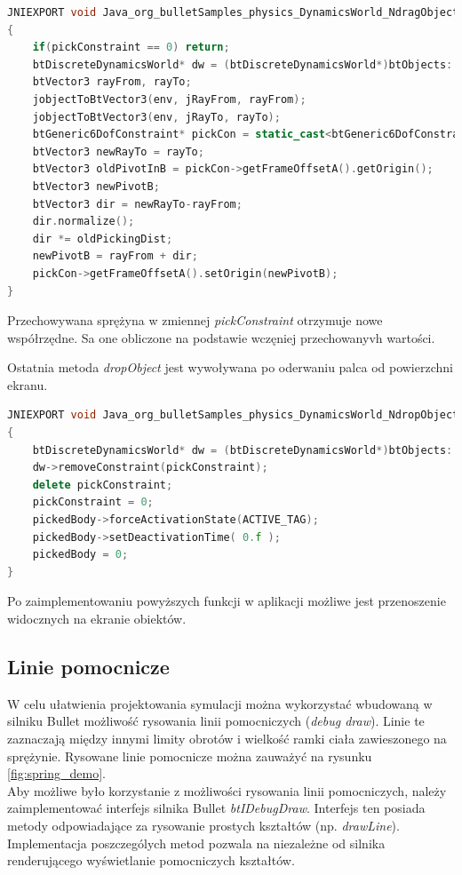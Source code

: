 \begin{lstlisting}[language=c++, caption=Implementacja
metody dragObject,label=lis:dragObject]
JNIEXPORT void Java_org_bulletSamples_physics_DynamicsWorld_NdragObject( JNIEnv* env, jobject self, jint id, jobject jRayFrom, jobject jRayTo )
{
	if(pickConstraint == 0) return;
	btDiscreteDynamicsWorld* dw = (btDiscreteDynamicsWorld*)btObjects::get(id);
	btVector3 rayFrom, rayTo;
	jobjectToBtVector3(env, jRayFrom, rayFrom);
	jobjectToBtVector3(env, jRayTo, rayTo);
	btGeneric6DofConstraint* pickCon = static_cast<btGeneric6DofConstraint*>(pickConstraint);
	btVector3 newRayTo = rayTo;
	btVector3 oldPivotInB = pickCon->getFrameOffsetA().getOrigin();
	btVector3 newPivotB;
	btVector3 dir = newRayTo-rayFrom;
	dir.normalize();
	dir *= oldPickingDist;
	newPivotB = rayFrom + dir;
	pickCon->getFrameOffsetA().setOrigin(newPivotB);
}
\end{lstlisting}

Przechowywana sprężyna w zmiennej \emph{pickConstraint} otrzymuje nowe
współrzędne. Sa one obliczone na podstawie
wczęniej przechowanyvh wartości.

Ostatnia metoda \emph{dropObject} jest wywoływana po oderwaniu palca od
powierzchni ekranu.

\begin{lstlisting}[language=c++, caption=Implementacja
metody dropObject,label=lis:dropObject]
JNIEXPORT void Java_org_bulletSamples_physics_DynamicsWorld_NdropObject( JNIEnv* env, jobject self, jint id, jobject jRayFrom, jobject jRayTo )
{
	btDiscreteDynamicsWorld* dw = (btDiscreteDynamicsWorld*)btObjects::get(id);
	dw->removeConstraint(pickConstraint);
	delete pickConstraint;
	pickConstraint = 0;
	pickedBody->forceActivationState(ACTIVE_TAG);
	pickedBody->setDeactivationTime( 0.f );
	pickedBody = 0;
}
\end{lstlisting}

Po zaimplementowaniu powyższych funkcji w aplikacji możliwe jest przenoszenie
widocznych na ekranie obiektów.

\subsection{Linie pomocnicze}\label{sec:debugDrawer}
W celu ułatwienia projektowania symulacji można wykorzystać
wbudowaną w silniku Bullet możliwość rysowania linii pomocniczych (\emph{debug
draw}). Linie te zaznaczają między innymi limity obrotów i wielkość ramki ciała
zawieszonego na sprężynie. Rysowane linie pomocnicze można zauważyć na rysunku
\ref{fig:spring_demo}.\\
Aby możliwe było korzystanie z możliwości rysowania linii pomocniczych, należy
zaimplementować interfejs silnika Bullet \emph{btIDebugDraw}. Interfejs ten
posiada metody odpowiadające za rysowanie prostych kształtów (np. \emph{drawLine}).
\newpage Implementacja poszczególych metod pozwala na niezależne od silnika
renderującego wyświetlanie pomocniczych kształtów.

